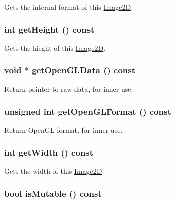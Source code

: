 Gets the internal format of this \hyperlink{classm3g_1_1Image2D}{Image2D}. \hypertarget{classm3g_1_1Image2D_317329daf960a1759801c0f16d43d5a3}{
\subsubsection[{getHeight}]{\setlength{\rightskip}{0pt plus 5cm}int getHeight () const}}
\label{classm3g_1_1Image2D_317329daf960a1759801c0f16d43d5a3}


Gets the hieght of this \hyperlink{classm3g_1_1Image2D}{Image2D}. \hypertarget{classm3g_1_1Image2D_b837b1bdda59947a6d818c448965c502}{
\subsubsection[{getOpenGLData}]{\setlength{\rightskip}{0pt plus 5cm}void $\ast$ getOpenGLData () const}}
\label{classm3g_1_1Image2D_b837b1bdda59947a6d818c448965c502}


Return pointer to raw data, for inner use. \hypertarget{classm3g_1_1Image2D_3e28ae5596cde78a980de02005a136f2}{
\subsubsection[{getOpenGLFormat}]{\setlength{\rightskip}{0pt plus 5cm}unsigned int getOpenGLFormat () const}}
\label{classm3g_1_1Image2D_3e28ae5596cde78a980de02005a136f2}


Return OpenGL format, for inner use. \hypertarget{classm3g_1_1Image2D_f149cb053bc8b5fbc1364b5dbb934488}{
\subsubsection[{getWidth}]{\setlength{\rightskip}{0pt plus 5cm}int getWidth () const}}
\label{classm3g_1_1Image2D_f149cb053bc8b5fbc1364b5dbb934488}


Gets the width of this \hyperlink{classm3g_1_1Image2D}{Image2D}. \hypertarget{classm3g_1_1Image2D_d687aabba553d1c66bfc253ec7e5bd05}{
\subsubsection[{isMutable}]{\setlength{\rightskip}{0pt plus 5cm}bool isMutable () const}}
\label{classm3g_1_1Image2D_d687aabba553d1c66bfc253ec7e5bd05}


